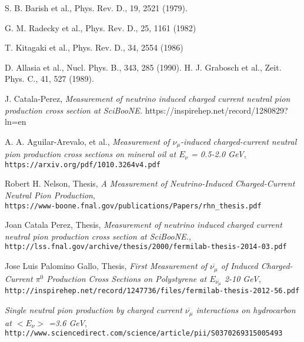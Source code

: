 \documentclass[12pt]{article}
\begin{document}
\begin{thebibliography}{9}


  S. B. Barish et al., Phys. Rev. D., 19, 2521 (1979).

 G. M. Radecky et al., Phys. Rev. D., 25, 1161 (1982)
 
 T. Kitagaki et al., Phys. Rev. D., 34, 2554 (1986)
 
 D. Allasia et al., Nucl. Phys. B., 343, 285 (1990).
 H. J. Grabosch et al., Zeit. Phys. C., 41, 527 (1989).

J. Catala-Perez, \emph{Measurement of neutrino induced charged current neutral pion production cross section at SciBooNE.}
https://inspirehep.net/record/1280829?ln=en

  A. A. Aguilar-Arevalo, et al., \emph{Measurement of $\nu_\mu$-induced charged-current neutral pion production cross sections on mineral oil at $E_\nu$ = 0.5-2.0 GeV},\\
  \texttt{https://arxiv.org/pdf/1010.3264v4.pdf}

  Robert H. Nelson, Thesis, \emph{A Measurement of Neutrino-Induced Charged-Current Neutral Pion Production},\\
  \texttt{https://www-boone.fnal.gov/publications/Papers/rhn\_thesis.pdf}
  
  Joan Catala Perez, Thesis, \emph{Measurement of neutrino induced charged current neutral pion production cross section at SciBooNE.},\\
  \texttt{http://lss.fnal.gov/archive/thesis/2000/fermilab-thesis-2014-03.pdf}  

  Jose Luis Palomino Gallo, Thesis, \emph{First Measurement of $\overline{\nu_\mu}$ of Induced Charged-Current $\pi^0$ Production Cross Sections on Polystyrene at $E_{\overline{\nu_\mu}}$ 2-10 GeV},\\
  \texttt{http://inspirehep.net/record/1247736/files/fermilab-thesis-2012-56.pdf}  
  
   \emph{Single neutral pion production by charged current $\overline{\nu_\mu}$ interactions on hydrocarbon at $< E_\nu >$ =3.6 GeV},\\
  \texttt{http://www.sciencedirect.com/science/article/pii/S0370269315005493}  
  

\end{thebibliography}
\end{document}
